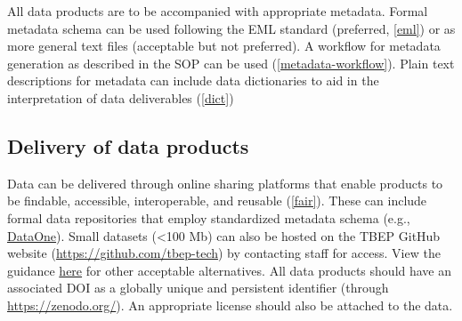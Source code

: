 \documentclass[
]{book}
\begin{document}
All data products are to be accompanied with appropriate metadata. Formal metadata schema can be used following the EML standard (preferred, \ref{eml}) or as more general text files (acceptable but not preferred). A workflow for metadata generation as described in the SOP can be used (\ref{metadata-workflow}). Plain text descriptions for metadata can include data dictionaries to aid in the interpretation of data deliverables (\ref{dict})

\hypertarget{delivery-of-data-products}{%
\subsection{Delivery of data products}\label{delivery-of-data-products}}

Data can be delivered through online sharing platforms that enable products to be findable, accessible, interoperable, and reusable (\ref{fair}). These can include formal data repositories that employ standardized metadata schema (e.g., \href{https://www.dataone.org/}{DataOne}). Small datasets (\textless100 Mb) can also be hosted on the TBEP GitHub website (\url{https://github.com/tbep-tech}) by contacting staff for access. View the guidance \href{https://tbep-tech.github.io/data-management-sop/keys.html\#datahome}{here} for other acceptable alternatives. All data products should have an associated DOI as a globally unique and persistent identifier (through \url{https://zenodo.org/}). An appropriate license should also be attached to the data.

  
\end{document}
